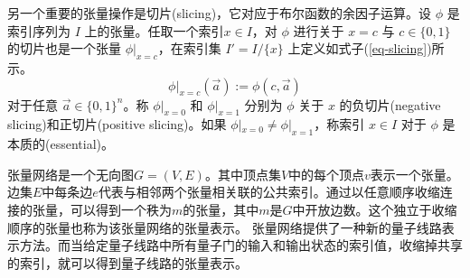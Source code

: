 另一个重要的张量操作是切片(slicing)，它对应于布尔函数的余因子运算。设 $\phi$ 是索引序列为 $I$ 上的张量。任取一个索引\(x\in I\)，对 $\phi$ 进行关于 $x = c$ 与 $c \in \{0, 1\}$ 的切片也是一个张量 $\phi|_{x=c}$，在索引集 $I' =I/\{x\}$ 上定义如式子(\ref{eq-slicing})所示。
\begin{equation}
    \label{eq-slicing}
\phi|_{x=c}(\overrightarrow{a}) := \phi(c, \overrightarrow{a})
\end{equation}
对于任意 $\overrightarrow{a} \in \{0, 1\}^n$。称 $\phi|_{x=0}$ 和 $\phi|_{x=1}$ 分别为 $\phi$ 关于 $x$ 的负切片(negative slicing)和正切片(positive slicing)。如果 $\phi|_{x=0} \neq \phi|_{x=1}$，称索引 $x \in I$ 对于 $\phi$ 是本质的(essential)。


张量网络是一个无向图\(G=\left(V,E\right)\)。其中顶点集$V$中的每个顶点$v$表示一个张量。边集\(E\)中每条边\(e\)代表与相邻两个张量相关联的公共索引。通过以任意顺序收缩连接的张量，可以得到一个秩为\(m\)的张量，其中\(m\)是$G$中开放边数。这个独立于收缩顺序的张量也称为该张量网络的张量表示\citep{biamonte2019lectures}。
张量网络提供了一种新的量子线路表示方法\citep{pednault2017breaking}。而当给定量子线路中所有量子门的输入和输出状态的索引值，收缩掉共享的索引，就可以得到量子线路的张量表示。


